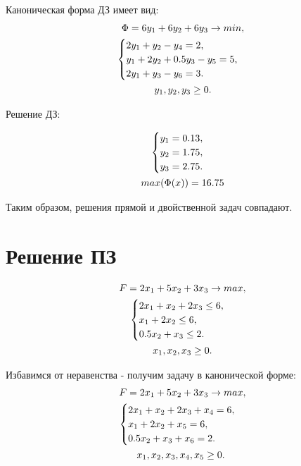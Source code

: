 \documentclass[12pt,a4paper,oneside]{extarticle}
\begin{document}
    Каноническая форма ДЗ имеет вид:
    \begin{gather}
        \Phi = 6y_1 + 6y_2 + 6y_3 \rightarrow min,  \notag  \\
        \begin{cases}
            2y_1 + y_2 - y_4 = 2, \\
            y_1 + 2y_2 + 0.5y_3 - y_5 = 5, \\
            2y_1 + y_3 - y_6 = 3.
        \end{cases} \notag \\
        y_1, y_2, y_3 \geq 0. \notag
    \end{gather} 

    Решение ДЗ:

    \begin{gather}
        \begin{cases}
            y_1 = 0.13,\\
            y_2 = 1.75, \\
            y_3 = 2.75. \\
        \end{cases} \notag \\
        max (\Phi(x)) = 16.75 \notag 
    \end{gather}

    Таким образом, решения прямой и двойственной задач совпадают.

\clearpage

\section{Решение ПЗ}
    \label{sec:pz}
    \begin{gather}
        F = 2x_1+5x_2+3x_3 \rightarrow max,  \notag  \\
        \begin{cases}
            2x_1 + x_2 + 2x_3 \leq 6, \\
            x_1 + 2x_2 \leq 6, \\
            0.5x_2 + x_3 \leq 2.
        \end{cases} \notag \\
        x_1, x_2, x_3 \geq 0. \notag
    \end{gather} 

    Избавимся от неравенства - получим задачу в канонической форме:
    \begin{gather}
        F = 2x_1+5x_2+3x_3 \rightarrow max,  \notag  \\
        \begin{cases}
            2x_1 + x_2 + 2x_3 + x_4 = 6, \\
            x_1 + 2x_2 + x_5 = 6, \\
            0.5x_2 + x_3 + x_6 = 2.
        \end{cases} 
        \notag \\ x_1, x_2, x_3, x_4, x_5 \geq 0. \
    \end{gather} 
\end{document}
